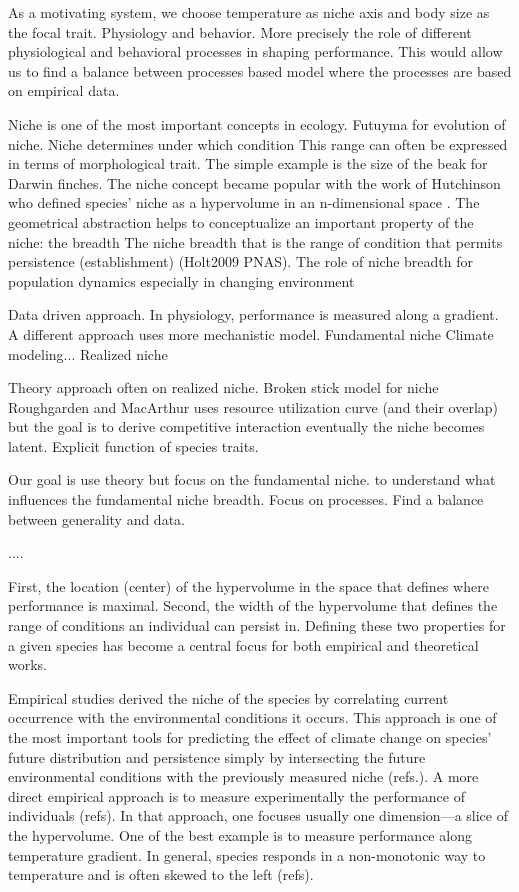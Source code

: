 As a motivating system, we choose temperature as niche axis and body size as the focal trait. 
Physiology and behavior.
More precisely the role of different physiological and behavioral processes in shaping performance.
This would allow us to find a balance between processes based model where the processes are based on empirical data.
 

 



Niche is one of the most important concepts in ecology.
Futuyma for evolution of niche.
Niche determines under which condition 
This range can often be expressed in terms of morphological trait. 
The simple example is the size of the beak for Darwin finches.
The niche concept became popular with the work of Hutchinson who defined species' niche as a hypervolume in an n-dimensional space \citep{Hutchinson1957}.
The geometrical abstraction helps to conceptualize an important property of the niche: the breadth
The niche breadth that is the range of condition that permits persistence (establishment) (Holt2009 PNAS).
The role of niche breadth for population dynamics especially in changing environment 
      
Data driven approach.
In physiology, performance is measured along a gradient.
A different approach uses more mechanistic model.
Fundamental niche
Climate modeling...
Realized niche

Theory approach often on realized niche.
Broken stick model for niche
Roughgarden and MacArthur uses resource utilization curve (and their overlap) but the goal is to derive competitive interaction eventually the niche becomes latent. 
Explicit function of species traits.    

Our goal is use theory but focus on the fundamental niche.
to understand what influences the fundamental niche breadth.
Focus on processes.
Find a balance between generality and data. 

....   
  
  
First, the location (center) of the hypervolume in the space that defines where performance is maximal.
Second, the width of the hypervolume that defines the range of conditions an individual can persist in. 
Defining these two properties for a given species has become a central focus for both empirical and theoretical works.


Empirical studies derived the niche of the species by correlating current occurrence with the environmental conditions it occurs. 
This approach is one of the most important tools for predicting the effect of climate change on species' future distribution and persistence simply by intersecting the future environmental conditions with the previously measured niche (refs.).
A more direct empirical approach is to measure experimentally the performance of individuals (refs).
In that approach, one focuses usually one dimension---a slice of the hypervolume.
One of the best example is to measure performance along temperature gradient. 
In general, species responds in a non-monotonic way to temperature and is often skewed to the left (refs).

